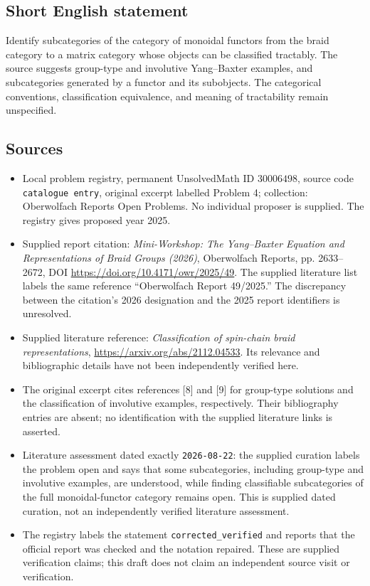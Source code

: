 \documentclass[11pt]{article}
\begin{document}
\subsection{Short English statement}
Identify subcategories of the category of monoidal functors from the braid category to a matrix category whose objects can be classified tractably. The source suggests group-type and involutive Yang--Baxter examples, and subcategories generated by a functor and its subobjects. The categorical conventions, classification equivalence, and meaning of tractability remain unspecified.
\subsection{Sources}
\begin{itemize}
\item Local problem registry, permanent UnsolvedMath ID \(30006498\), source code \texttt{catalogue entry}, original excerpt labelled Problem 4; collection: Oberwolfach Reports Open Problems. No individual proposer is supplied. The registry gives proposed year 2025.
\item Supplied report citation: \emph{Mini-Workshop: The Yang--Baxter Equation and Representations of Braid Groups (2026)}, Oberwolfach Reports, pp. 2633--2672, DOI \url{https://doi.org/10.4171/owr/2025/49}. The supplied literature list labels the same reference ``Oberwolfach Report 49/2025.'' The discrepancy between the citation's 2026 designation and the 2025 report identifiers is unresolved.
\item Supplied literature reference: \emph{Classification of spin-chain braid representations}, \url{https://arxiv.org/abs/2112.04533}. Its relevance and bibliographic details have not been independently verified here.
\item The original excerpt cites references [8] and [9] for group-type solutions and the classification of involutive examples, respectively. Their bibliography entries are absent; no identification with the supplied literature links is asserted.
\item Literature assessment dated exactly \texttt{2026-08-22}: the supplied curation labels the problem open and says that some subcategories, including group-type and involutive examples, are understood, while finding classifiable subcategories of the full monoidal-functor category remains open. This is supplied dated curation, not an independently verified literature assessment.
\item The registry labels the statement \texttt{corrected\_verified} and reports that the official report was checked and the notation repaired. These are supplied verification claims; this draft does not claim an independent source visit or verification.
\end{itemize}
\end{document}
